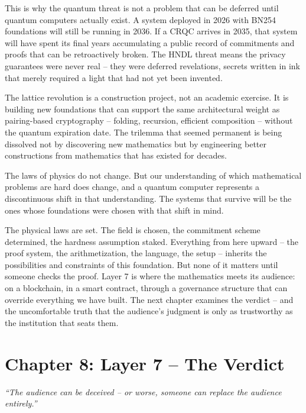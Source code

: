 \documentclass[
  11pt,
  openany]{report}
\begin{document}
This is why the quantum threat is not a problem that can be deferred until
quantum computers actually exist. A system deployed in 2026 with BN254
foundations will still be running in 2036. If a CRQC arrives in 2035, that
system will have spent its final years accumulating a public record of
commitments and proofs that can be retroactively broken. The HNDL threat means
the privacy guarantees were never real -- they were deferred revelations,
secrets written in ink that merely required a light that had not yet been
invented.

The lattice revolution is a construction project, not an academic exercise. It
is building new foundations that can support the same architectural weight as
pairing-based cryptography -- folding, recursion, efficient composition --
without the quantum expiration date. The trilemma that seemed permanent is being
dissolved not by discovering new mathematics but by engineering better
constructions from mathematics that has existed for decades.

The laws of physics do not change. But our understanding of which mathematical
problems are hard does change, and a quantum computer represents a discontinuous
shift in that understanding. The systems that survive will be the ones whose
foundations were chosen with that shift in mind.

\par\vspace{18pt}

The physical laws are set. The field is chosen, the commitment scheme
determined, the hardness assumption staked. Everything from here upward -- the
proof system, the arithmetization, the language, the setup -- inherits the
possibilities and constraints of this foundation. But none of it matters until
someone checks the proof. Layer 7 is where the mathematics meets its audience:
on a blockchain, in a smart contract, through a governance structure that can
override everything we have built. The next chapter examines the verdict -- and
the uncomfortable truth that the audience's judgment is only as trustworthy as
the institution that seats them.

\chapter{Chapter 8: Layer 7 -- The Verdict}\label{chapter-8-layer-7-the-verdict}

\emph{``The audience can be deceived -- or worse, someone can replace the
audience entirely.''}
\end{document}
